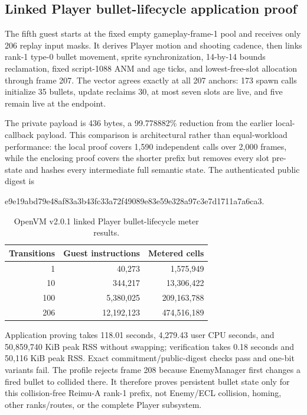 \subsection{Linked Player bullet-lifecycle application proof}

The fifth guest starts at the fixed empty gameplay-frame-1 pool and receives
only 206 replay input masks.  It derives Player motion and shooting cadence,
then links rank-1 type-0 bullet movement, sprite synchronization, 14-by-14
bounds reclamation, fixed script-1088 ANM and age ticks, and lowest-free-slot
allocation through frame 207.  The vector agrees exactly at all 207 anchors:
173 spawn calls initialize 35 bullets, update reclaims 30, at most seven slots
are live, and five remain live at the endpoint.

The private  payload is 436 bytes, a 99.778882\% reduction from
the earlier local-callback payload.  This comparison is architectural rather
than equal-workload performance: the local proof covers 1,590 independent
calls over 2,000 frames, while the enclosing proof covers the shorter prefix
but removes every slot pre-state and hashes every intermediate full semantic
state.  The authenticated public digest is
\begin{center}
\small\ttfamily
e9e19abd79e48af83a3b43fc33a72f49089e83e59e328a97c3e7d1711a7a6ca3.
\end{center}

\begin{table}[h]
  \centering
  \small
  \begin{tabular}{@{}rrr@{}}
    \toprule
    Transitions & Guest instructions & Metered cells \\
    \midrule
    1   & 40,273     & 1,575,949 \\
    10  & 344,217    & 13,306,422 \\
    100 & 5,380,025  & 209,163,788 \\
    206 & 12,192,123 & 474,516,189 \\
    \bottomrule
  \end{tabular}
  \caption{OpenVM v2.0.1 linked Player bullet-lifecycle meter results.}
  \label{tab:openvm-player-bullet-lifecycle-meter}
\end{table}

Application proving takes 118.01 seconds, 4,279.43 user CPU seconds, and
50,859,740 KiB peak RSS without swapping; verification takes 0.18 seconds and
50,116 KiB peak RSS.  Exact commitment/public-digest checks pass and one-bit
variants fail.  The profile rejects frame 208 because EnemyManager first
changes a fired bullet to collided there.  It therefore proves persistent
bullet state only for this collision-free Reimu-A rank-1 prefix, not Enemy/ECL
collision, homing, other ranks/routes, or the complete Player subsystem.

